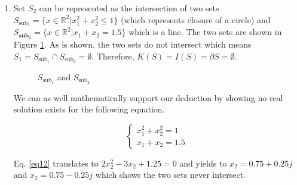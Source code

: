\begin{enumerate}[label=(\alph*)]
\item Set $S_2$ can be represented as the intersection of two sets $S_{\text{sub}_1} = \{x \in \mathbb{R}^2 | x_1^2 + x_2^2 \leqslant 1 \}$ (which represents closure of a circle) and $S_{\textbf{sub}_2} = \{x \in \mathbb{R}^2 | x_1 + x_2 = 1.5\}$ which is a line.
The two sets are shown in Figure \ref{fig12}.
As is shown, the two sets do not intersect which means $S_1 = S_{\text{sub}_1} \cap S_{\text{sub}_2} = \emptyset$.
Therefore, $K(S) = I(S) = \partial S = \emptyset$.

\begin{figure}[H]\centering
{}
\caption{$S_{\text{sub}_1}$ and $S_{\text{sub}_2}$}\label{fig12}
\end{figure}

We can as well mathematically support our deduction by showing no real solution exists for the following equation.

\begin{equation}
\left\{ \begin{array}{ll} x_1^2 + x_2^2 = 1 \\ x_1 + x_2 = 1.5 \end{array} \right.
\label{eq12}
\end{equation}

Eq. \ref{eq12} translates to $2x_2^2 - 3x_2 + 1.25 = 0$ and yields to $x_2 = 0.75 + 0.25j$ and $x_2 = 0.75 - 0.25j$ which shows the two sets never intersect.

\end{enumerate}
